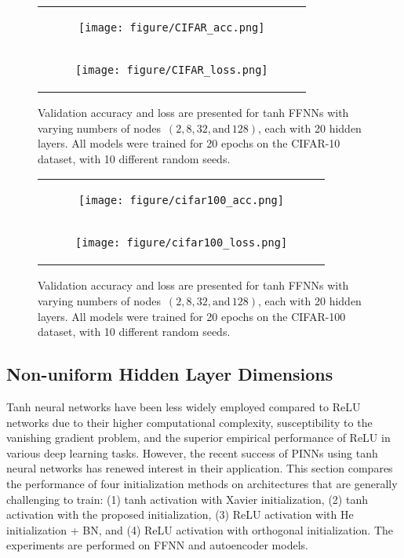 \documentclass{article} \usepackage{iclr2025_conference,times}
\begin{document}
\begin{figure}[h!]
\centering 
\begin{tabular}{c}
\begin{subfigure}[b]{0.97\textwidth}
    \centering
    \texttt{[image: figure/CIFAR\_acc.png]}
\end{subfigure} \\
\begin{subfigure}[b]{0.97\textwidth}
    \centering
    \texttt{[image: figure/CIFAR\_loss.png]}
\end{subfigure} 
\end{tabular}
\caption{Validation accuracy and loss are presented for tanh FFNNs with varying numbers of nodes~$(2, 8, 32, \text{and}\,128)$, each with 20 hidden layers. All models were trained for 20 epochs on the CIFAR-10 dataset, with 10 different random seeds.}
\end{figure}

\newpage 

\begin{figure}[h!]
\centering 
\begin{tabular}{c}
\begin{subfigure}[b]{0.97\textwidth}
    \centering
    \texttt{[image: figure/cifar100\_acc.png]}
\end{subfigure} \\
\begin{subfigure}[b]{0.97\textwidth}
    \centering
    \texttt{[image: figure/cifar100\_loss.png]}
\end{subfigure} 
\end{tabular}
\caption{Validation accuracy and loss are presented for tanh FFNNs with varying numbers of nodes~$(2, 8, 32, \text{and}\,128)$, each with 20 hidden layers. All models were trained for 20 epochs on the CIFAR-100 dataset, with 10 different random seeds.}
\end{figure}


\newpage

\subsection{Non-uniform Hidden Layer Dimensions}\label{nonuniform}
Tanh neural networks have been less widely employed compared to ReLU networks due to their higher computational complexity, susceptibility to the vanishing gradient problem, and the superior empirical performance of ReLU in various deep learning tasks.
However, the recent success of PINNs using tanh neural networks has renewed interest in their application. This section compares the performance of four initialization methods on architectures that are generally challenging to train: (1) tanh activation with Xavier initialization, (2) tanh activation with the proposed initialization, (3) ReLU activation with He initialization + BN, and (4) ReLU activation with orthogonal initialization. The experiments are performed on FFNN and autoencoder models.
\end{document}
